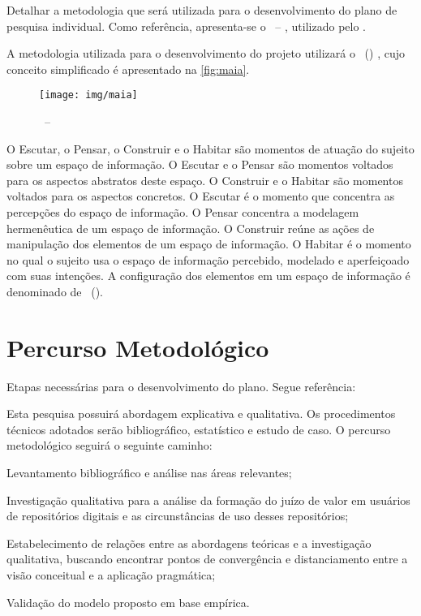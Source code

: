 
Detalhar a metodologia que será utilizada para o desenvolvimento do plano de pesquisa individual. Como referência, apresenta-se o \MAIA\ -- \maia, utilizado pelo \inova.

A metodologia utilizada para o desenvolvimento do projeto utilizará o \MAIA\ (\maia) \cite{costa_um_2010}, cujo conceito simplificado é apresentado na \autoref{fig:maia}.

\begin{figure}[H]
  \centering
  \caption[\maia]{\MAIA\ -- \maia}\label{fig:maia}
  \texttt{[image: img/maia]}
\end{figure}

O Escutar, o Pensar, o Construir e o Habitar são momentos de atuação do sujeito sobre um espaço de informação. O Escutar e o Pensar são momentos voltados para os aspectos abstratos deste espaço. O Construir e o Habitar são momentos voltados para os aspectos concretos. O Escutar é o momento que concentra as percepções do espaço de informação. O Pensar concentra a modelagem hermenêutica de um espaço de informação. O Construir reúne as ações de manipulação dos elementos de um espaço de informação. O Habitar é o momento no qual o sujeito usa o espaço de informação percebido, modelado e aperfeiçoado com suas intenções. A configuração dos elementos em um espaço de informação é denominado de \AI\ (\ai).


\section{Percurso Metodológico}\label{sec:percurso_metodologico}

Etapas necessárias para o desenvolvimento do plano. Segue referência:

Esta pesquisa possuirá abordagem explicativa e qualitativa. Os procedimentos técnicos adotados serão bibliográfico, estatístico e estudo de caso. O percurso metodológico seguirá o seguinte caminho:

\begin{alineas}
    \item Levantamento bibliográfico e análise nas áreas relevantes;
    
    \item Investigação qualitativa para a análise da formação do juízo de valor em usuários de repositórios digitais e as circunstâncias de uso desses repositórios;
    
    \item Estabelecimento de relações entre as abordagens teóricas e a investigação qualitativa, buscando encontrar pontos de convergência e distanciamento entre a visão conceitual e a aplicação pragmática;

    \item Validação do modelo proposto em base empírica.
\end{alineas}

